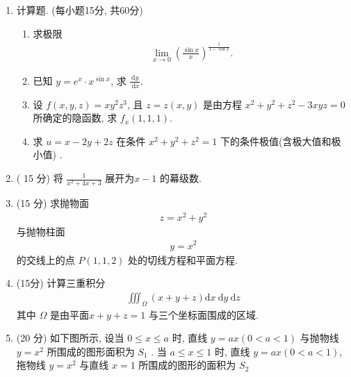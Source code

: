\documentclass[space]{ctexart} %
\def\leq{\leqslant}
\begin{document}
\vspace*{0.5cm}
\begin{enumerate}[itemsep=1.2em,label=\arabic*.,topsep=0pt,left=0em]
\item 计算题. (每小题15分, 共60分)

\setcounter{enumii}{0}
\begin{enumerate}[itemsep=1.2em,label=(\arabic*),topsep=0pt,left=2em]
	\item 求极限
\begin{align*}
    \lim _{x \rightarrow 0}\left(\frac{\sin x}{x}\right)^{\frac{1}{1-\cos x}}.
\end{align*}

    \item 已知  $y=e^{x} \cdot x^{\sin x} $, 求 $ \frac{\mathrm{d} y}{\mathrm{~d} x} $.

    \item 设  $f(x, y, z)=x y^{2} z^{3} $, 且 $z=z(x, y) $ 是由方程 $ x^{2}+y^{2}+z^{2}-3 x y z=0 $ 所确定的隐函数, 求 $ f_{x}(1,1,1) $.

    \item 求 $ u=x-2 y+2 z $ 在条件 $ x^{2}+y^{2}+z^{2}=1 $ 下的条件极值(含极大值和极小值) .

\end{enumerate}

\item ( 15 分)  将 $ \frac{1}{x^{2}+4 x+3} $ 展开为$  x-1 $ 的幕级数.

\item (15 分)  求抛物面
\begin{align*}
z=x^{2}+y^{2}
\end{align*}
与抛物柱面
\begin{align*}
y=x^{2}
\end{align*}
的交线上的点 $ P(1,1,2) $ 处的切线方程和平面方程.

\item  (15分)  计算三重积分
\begin{align*}
\iiint_{\Omega}(x+y+z) \mathrm{d} x \mathrm{~d} y \mathrm{~d} z
\end{align*}
其中 $ \Omega $ 是由平面$  x+y+z=1 $ 与三个坐标面围成的区域.


\item (20 分)  如下图所示, 设当  $0 \leq x \leq a $ 时, 直线  $y=a x(0<a<1)$  与抛物线  $y=x^{2} $ 所围成的图形面积为 $ S_{1}$ . 当 $ a \leq x \leq 1 $ 时, 直线 $ y=a x(0<a<1) $, 拖物线 $ y=x^{2} $ 与直线 $ x=1 $ 所围成的图形的面积为 $ S_{2}$


\end{enumerate}
\end{document}
